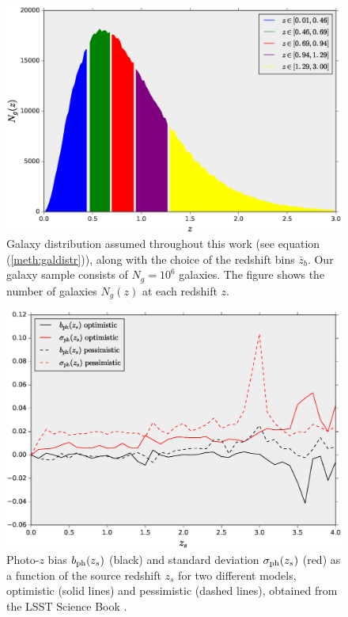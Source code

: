 \documentclass[reprint,aps,prd,superscriptaddress,showkeys,showpacs]{revtex4-1}
\begin{document}
\begin{figure}
\includegraphics[scale=0.3]{Figures/galdistr.eps}
\caption{Galaxy distribution assumed throughout this work (see equation (\ref{meth:galdistr})), along with the choice of the redshift bins $\bar{z}_b$. Our galaxy sample consists of $N_g=10^6$ galaxies. The figure shows the number of galaxies $N_g(z)$ at each redshift $z$.}
\label{fig:galdistr}
\end{figure}

\begin{figure}
\includegraphics[scale=0.3]{Figures/scibook.eps}
\caption{Photo-$z$ bias $b_{\rm ph}(z_s)$ (black) and standard deviation $\sigma_{\rm ph}(z_s)$ (red) as a function of the source redshift $z_s$ for two different models, optimistic (solid lines) and pessimistic (dashed lines), obtained from the LSST Science Book \citep{LSSTSciBook}.}
\label{fig:lsstscibook}
\end{figure}
\end{document}
